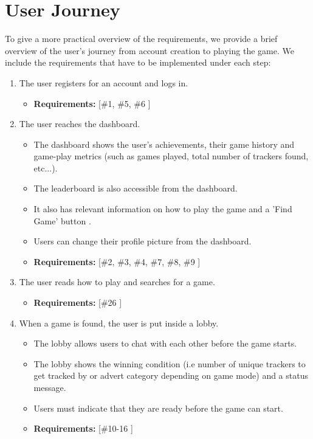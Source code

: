 \documentclass{l4proj}
\begin{document}
\section{User Journey}
To give a more practical overview of the requirements, we provide a brief overview of the user's journey from account creation to playing the game. We include the requirements that have to be implemented under each step:
\begin{enumerate}
    \item The user registers for an account and logs in.
    \begin{itemize}
 	\item \textbf{Requirements: } [\#1, \#5, \#6 ]
    \end{itemize}
    \item The user reaches the dashboard.
    \begin{itemize}
 	\item The dashboard shows the user's achievements, their game history and game-play metrics (such as games played, total number of trackers found, etc...).
           \item The leaderboard is also accessible from the dashboard.
	\item It also has relevant information on how to play the game and a 'Find Game' button .
           \item Users can change their profile picture from the dashboard.
 	\item \textbf{Requirements: } [\#2, \#3, \#4, \#7, \#8, \#9 ]
    \end{itemize}
    \item The user reads how to play and searches for a game.
    \begin{itemize}
 	\item \textbf{Requirements: } [\#26 ]
    \end{itemize}
    \item When a game is found, the user is put inside a lobby.
    \begin{itemize}
 	\item The lobby allows users to chat with each other before the game starts.
           \item The lobby shows the winning condition  (i.e number of unique trackers to get tracked by or advert category depending on game mode) and a status message.
           \item Users must indicate that they are ready before the game can start.
 	\item \textbf{Requirements: } [\#10-16 ]

\end{itemize}
\end{enumerate}
\end{document}
